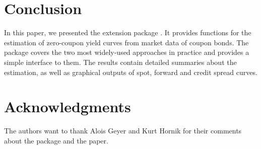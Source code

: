 \section{Conclusion}
\label{sec:conclusion}

In this paper, we presented the  extension package . It provides functions for the estimation of zero-coupon yield curves from market data of coupon bonds. The package covers the two most widely-used approaches in practice and provides a simple interface to them. The results contain detailed summaries about the estimation, as well as graphical outputs of spot, forward and credit spread curves.


\section*{Acknowledgments}

The authors want to thank Alois Geyer and Kurt Hornik for their comments about the package and the paper.


